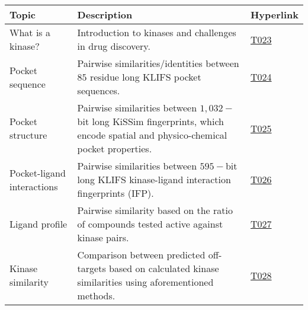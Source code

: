 \begin{tabular}{p{}p{}p{}}
    \hline
    \textbf{Topic} & \textbf{Description} & \textbf{Hyperlink} \\
    \hline
    \hline
    What is a kinase? & Introduction to kinases and challenges in drug discovery. & \href{https://projects.volkamerlab.org/teachopencadd/talktorials/T023\_what\_is\_a\_kinase.html}{T023} \\
    Pocket sequence & Pairwise similarities/identities between $85$ residue long KLIFS pocket sequences. & \href{https://projects.volkamerlab.org/teachopencadd/talktorials/T024\_kinase\_similarity\_sequence.html}{T024} \\
    Pocket structure & Pairwise similarities between $1,032-$bit long KiSSim fingerprints, which encode spatial and physico-chemical pocket properties. & \href{https://projects.volkamerlab.org/teachopencadd/talktorials/T025\_kinase\_similarity\_kissim.html}{T025} \\
    Pocket-ligand interactions & Pairwise similarities between $595-$bit long KLIFS kinase-ligand interaction fingerprints (IFP). & \href{https://projects.volkamerlab.org/teachopencadd/talktorials/T026\_kinase\_similarity\_ifp.html}{T026} \\
    Ligand profile & Pairwise similarity based on the ratio of compounds tested active against kinase pairs.& \href{https://projects.volkamerlab.org/teachopencadd/talktorials/T027\_kinase\_similarity\_ligand\_profile.html}{T027} \\
    Kinase similarity & Comparison between predicted off-targets based on calculated kinase similarities using aforementioned methods. & \href{https://projects.volkamerlab.org/teachopencadd/talktorials/T028\_kinase\_similarity\_compare\_perspectives.html}{T028} \\
    \hline
\end{tabular}
